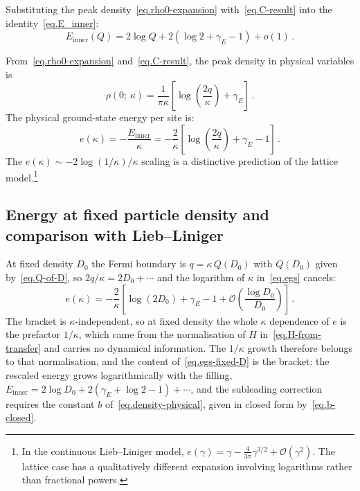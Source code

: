 \documentclass[11pt,a4paper]{article}
\newcommand{\kap}{\kappa}
\theoremstyle{definition}
\begin{document}
Substituting the peak density~\eqref{eq.rho0-expansion} with~\eqref{eq.C-result}
into the identity~\eqref{eq.E_inner}:
\begin{equation}\label{eq.E_inner_full}
  E_{\mathrm{inner}}(Q) = 2\log Q + 2(\log 2 + \gamma_E - 1)
  + o(1)\,.
\end{equation}

From~\eqref{eq.rho0-expansion} and~\eqref{eq.C-result}, the peak density in
physical variables is
\begin{equation}\label{eq.rho-physical}
  \rho(0;\,\kappa)
  = \frac{1}{\pi\kappa} \left[\log\left( \frac{2q}{\kap} \right) + \gamma_E \right]\,.
\end{equation}
The physical ground-state energy per site is:
\begin{equation}\label{eq.egs}
  e(\kap) = -\frac{E_{\mathrm{inner}}}{\kap}
  = -\frac{2}{\kappa}\left[\log\left( \frac{2q}{\kap} \right) + \gamma_E - 1\right]\,.
\end{equation}
The $e(\kappa) \sim -2\log(1/\kappa)/\kappa$ scaling is a distinctive prediction of the lattice model.\footnote{
In the continuous Lieb--Liniger model, $e(\gamma) = \gamma - \frac{4}{3\pi}\gamma^{3/2} + \mathcal O(\gamma^2)$. The lattice case has a qualitatively different expansion involving logarithms rather than fractional powers.
}

\subsection{Energy at fixed particle density and comparison with Lieb--Liniger}
At fixed density $D_0$ the Fermi boundary is $q = \kappa\,Q(D_0)$
with $Q(D_0)$ given by~\eqref{eq.Q-of-D}, so $2q/\kappa = 2D_0 + \cdots$ and the
logarithm of $\kappa$ in~\eqref{eq.egs} cancels:
\begin{equation}\label{eq.egs-fixed-D}
  e(\kap) = -\frac{2}{\kappa}\left[\log(2D_0) + \gamma_E - 1
  + \mathcal O \left(\frac{\log D_0}{D_0}\right)\right]\,.
\end{equation}
The bracket is $\kappa$-independent, so at fixed density the whole $\kappa$
dependence of $e$ is the prefactor $1/\kappa$, which came from the
normalisation of $H$ in~\eqref{eq.H-from-transfer} and carries no dynamical
information.  The $1/\kappa$ growth therefore belongs to that normalisation, and
the content of~\eqref{eq.egs-fixed-D} is the bracket: the rescaled
energy grows logarithmically with the filling, $E_{\mathrm{inner}} = 2\log D_0 +
2(\gamma_E + \log 2 - 1) + \cdots$, and the subleading correction requires the
constant $b$ of~\eqref{eq.density-physical}, given in closed form
by~\eqref{eq.b-closed}.
\end{document}
